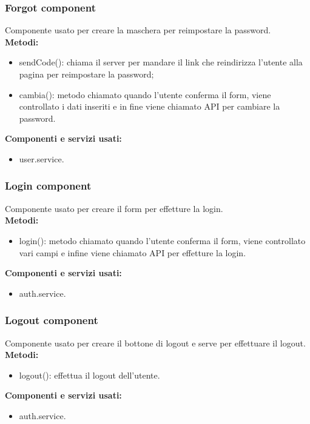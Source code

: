 \subsubsection{Forgot component}
Componente usato per creare la maschera per reimpostare la password.\\
\textbf{Metodi:}
\begin{itemize}
    \item sendCode(): chiama il server per mandare il link che reindirizza l'utente alla pagina per reimpostare la password;
    \item cambia(): metodo chiamato quando l'utente conferma il form, viene controllato i dati inseriti e in fine viene chiamato API per cambiare la password.
\end{itemize}
\textbf{Componenti e servizi usati:}
\begin{itemize}
    \item user.service.
\end{itemize}

\subsubsection{Login component}
Componente usato per creare il form per effetture la login.\\
\textbf{Metodi:}
\begin{itemize}
    \item login(): metodo chiamato quando l'utente conferma il form, viene controllato vari campi e infine viene chiamato API per effetture la login.
\end{itemize}
\textbf{Componenti e servizi usati:}
\begin{itemize}
    \item auth.service.
\end{itemize}

\subsubsection{Logout component}
Componente usato per creare il bottone di logout e serve per effettuare il logout.\\
\textbf{Metodi:}
\begin{itemize}
    \item logout(): effettua il logout dell'utente.
\end{itemize}
\textbf{Componenti e servizi usati:}
\begin{itemize}
    \item auth.service.
\end{itemize}

